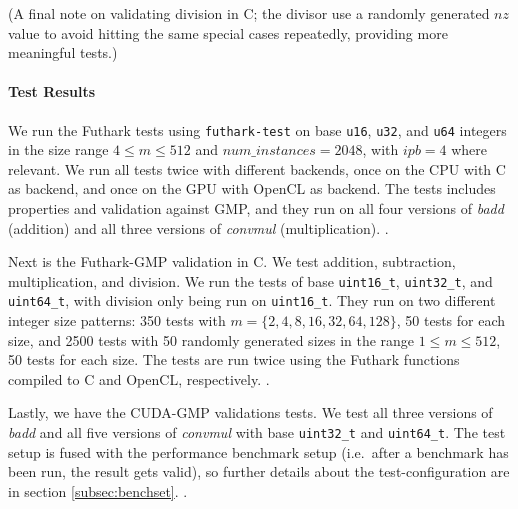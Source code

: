 (A final note on validating division in C; the divisor use a randomly generated
$nz$ value to avoid hitting the same special cases repeatedly, providing more
meaningful tests.)

\paragraph{Test Results}
We run the Futhark tests using \texttt{futhark-test} on base \texttt{u16},
\texttt{u32}, and \texttt{u64} integers in the size range $4\leq m \leq 512$ and
$num\_instances = 2048$, with $ipb = 4$ where relevant. We run all tests twice
with different backends, once on the CPU with C as backend, and once on the GPU
with OpenCL as backend. The tests includes properties and validation against
GMP, and they run on all four versions of \textit{badd} (addition) and all three
versions of \textit{convmul} (multiplication). .

Next is the Futhark-GMP validation in C. We test addition, subtraction,
multiplication, and division. We run the tests of base \texttt{uint16\_t},
\texttt{uint32\_t}, and \texttt{uint64\_t}, with division only being run on
\texttt{uint16\_t}. They run on two different integer size patterns: 350 tests
with $m=\{2,4,8,16,32,64,128\}$, 50 tests for each size, and 2500 tests with 50
randomly generated sizes in the range $1\leq m \leq 512$, 50 tests for each size. The
tests are run twice using the Futhark functions compiled to C and OpenCL,
respectively. .

Lastly, we have the CUDA-GMP validations tests. We test all three versions of
\textit{badd} and all five versions of \textit{convmul} with base
\texttt{uint32\_t} and \texttt{uint64\_t}. The test setup is fused with the
performance benchmark setup (i.e.\ after a benchmark has been run, the result
gets valid), so further details about the test-configuration are in section
\ref{subsec:benchset}. .

